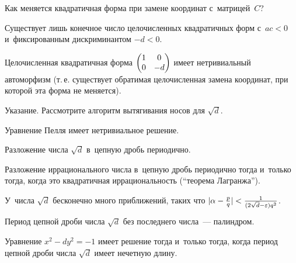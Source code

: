 \documentclass[a4paper, 11pt]{article}
\begin{document}
Как меняется квадратичная форма при замене координат с~матрицей~$C$?






 Существует лишь конечное число целочисленных квадратичных форм с~$ac<0$ и~фиксированным дискриминантом $-d<0$.

 Целочисленная квадратичная форма $\begin{pmatrix}1 & 0 \\ 0 & -d\end{pmatrix}$ имеет нетривиальный автоморфизм (т.\,е. существует обратимая целочисленная замена координат, при которой эта форма не меняется). %

{\small Указание. Рассмотрите алгоритм вытягивания носов для $\sqrt d$.\par}

 Уравнение Пелля имеет нетривиальное решение.

 Разложение числа $\sqrt d$ в~цепную дробь периодично.

 Разложение иррационального числа в~цепную дробь периодично тогда и~только тогда, когда это квадратичная иррациональность (``теорема Лагранжа'').






У~числа $\sqrt d$  бесконечно много приближений, таких что $|\alpha-\frac pq|<\smash{\frac1{(2\sqrt d-\varepsilon)q^2}}$.






 Период цепной дроби числа $\sqrt d$ без последнего числа~--- палиндром.

 Уравнение $x^2-dy^2=-1$ имеет решение тогда и~только тогда, когда период цепной дроби числа $\sqrt d$ имеет нечетную длину.











\end{document}
